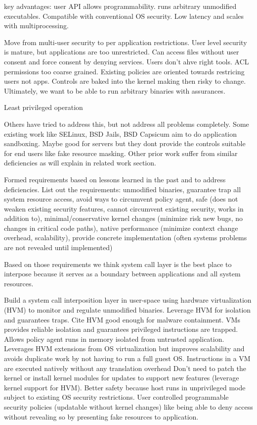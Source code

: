 \documentclass{article}
\begin{document}
\iffalse
key advantages:
user API allows programmability.
runs arbitrary unmodified executables.
Compatible with conventional OS security.
Low latency and scales with multiprocessing.

Move from multi-user security to per application restrictions.
User level security is mature, but applications are too unrestricted.
Can access files without user consent and force consent by denying services.
Users don't ahve right tools. ACL permissions too coarse grained.
Existing policies are oriented towards restricing users not apps.
Controls are baked into the kernel making then risky to change.
Ultimately, we want to be able to run arbitrary binaries with assurances.

Least privileged operation

Others have tried to address this, but not address all problems completely.
Some existing work like SELinux, BSD Jails, BSD Capsicum aim to do application sandboxing.
Maybe good for servers but they dont provide the controls suitable for end users like fake resource masking.
Other prior work suffer from similar deficiencies as will explain in related work section.

Formed requirements based on lessons learned in the past and to address deficiencies.
List out the requirements:
unmodified binaries,
guarantee trap all system resource access,
avoid ways to circumvent policy agent,
safe (does not weaken existing security features, cannot circumvent existing security, works in addition to),
minimal/conservative kernel changes (minimize risk new bugs, no changes in critical code paths),
native performance (minimize context change overhead, scalability),
provide concrete implementation (often systems problems are not revealed until implemented)

Based on those requirements we think system call layer is the best place to interpose because it serves as a boundary between applications and all system resources.

Build a system call interposition layer in user-space using hardware virtualization (HVM) to monitor and regulate unmodified binaries.
Leverage HVM for isolation and guarantees traps.
Cite HVM good enough for malware containment.
VMs provides reliable isolation and guarantees privileged instructions are trapped.
Allows policy agent runs in memory isolated from untrusted application.
Leverages HVM extensions from OS virtualization but improves scalability and avoids duplicate work by not having to run a full guest OS.
Instructions in a VM are executed natively without any translation overhead
Don’t need to patch the kernel or install kernel modules for updates to support new features (leverage kernel support for HVM).
Better safety because host runs in unprivileged mode subject to existing OS security restrictions.
User controlled programmable security policies (updatable without kernel changes) like being able to deny access without revealing so by presenting fake resources to application.
\end{document}
